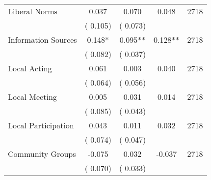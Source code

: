 \begin{tabular}{l*{4}{c}}
 Liberal Norms &              0.037 &         0.070 &           0.048 & 2718                       \\  
                 &        (       0.105)                   &        (       0.073)                        &                                                             &                                                      \\      

 Information Sources &              0.148* &         0.095** &           0.128** & 2718                       \\  
                 &        (       0.082)                   &        (       0.037)                        &                                                             &                                                      \\      

 Local Acting &              0.061 &         0.003 &           0.040 & 2718                       \\  
                 &        (       0.064)                   &        (       0.056)                        &                                                             &                                                      \\      

 Local Meeting &              0.005 &         0.031 &           0.014 & 2718                       \\  
                 &        (       0.085)                   &        (       0.043)                        &                                                             &                                                      \\      

 Local Participation &              0.043 &         0.011 &           0.032 & 2718                       \\  
                 &        (       0.074)                   &        (       0.047)                        &                                                             &                                                      \\      

 Community Groups &             -0.075 &         0.032 &          -0.037 & 2718                       \\  
                 &        (       0.070)                   &        (       0.033)                        &                                                             &                                                      \\      

\hline \end{tabular}                                                                                                              

